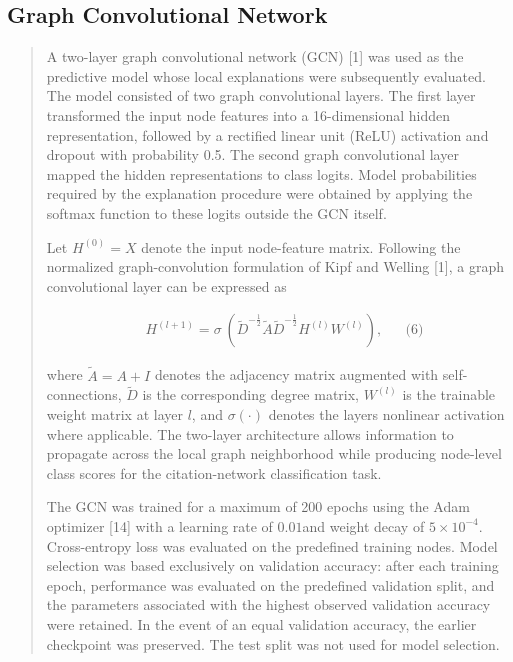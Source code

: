 \documentclass[a4paper]{article}
\begin{document}
\subsection{Graph Convolutional
Network}\label{graph-convolutional-network}

\begin{quote}
A two-layer graph convolutional network (GCN) {[}1{]} was used as the
predictive model whose local explanations were subsequently evaluated.
The model consisted of two graph convolutional layers. The first layer
transformed the input node features into a 16-dimensional hidden
representation, followed by a rectified linear unit (ReLU) activation
and dropout with probability 0.5. The second graph convolutional layer
mapped the hidden representations to class logits. Model probabilities
required by the explanation procedure were obtained by applying the
softmax function to these logits outside the GCN itself.

Let \(H^{(0)} = X\) denote the input node-feature matrix. Following the
normalized graph-convolution formulation of Kipf and Welling {[}1{]}, a
graph convolutional layer can be expressed as

\[\begin{matrix}
 & H^{(l + 1)} = \sigma\text{ }\left( {\widetilde{D}}^{- \frac{1}{2}}\widetilde{A}{\widetilde{D}}^{- \frac{1}{2}}H^{(l)}W^{(l)} \right), & & \text{(6)}
\end{matrix}
\]

where \(\widetilde{A} = A + I\) denotes the adjacency matrix augmented
with self-connections, \(\widetilde{D}\) is the corresponding degree
matrix, \(W^{(l)}\) is the trainable weight matrix at layer \(l\), and
\(\sigma( \cdot )\) denotes the layer\textquotesingle s nonlinear
activation where applicable. The two-layer architecture allows
information to propagate across the local graph neighborhood while
producing node-level class scores for the citation-network
classification task.

The GCN was trained for a maximum of 200 epochs using the Adam optimizer
{[}14{]} with a learning rate of \(0.01\)and weight decay of
\(5 \times 10^{- 4}\). Cross-entropy loss was evaluated on the
predefined training nodes. Model selection was based exclusively on
validation accuracy: after each training epoch, performance was
evaluated on the predefined validation split, and the parameters
associated with the highest observed validation accuracy were retained.
In the event of an equal validation accuracy, the earlier checkpoint was
preserved. The test split was not used for model selection.


\end{quote}
\end{document}
